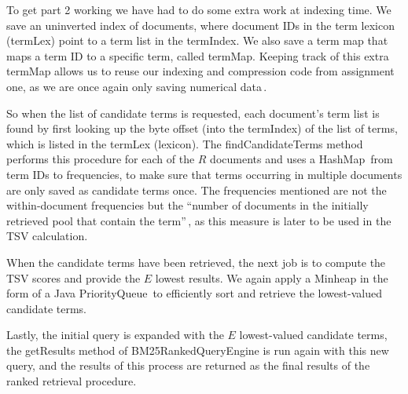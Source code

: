To get part 2 working we have had to do some extra work at indexing time. We save an uninverted index of documents, where document IDs in the term lexicon (termLex) point to a term list in the termIndex. We also save a term map that maps a term ID to a specific term, called termMap. Keeping track of this extra termMap allows us to reuse our indexing and compression code from assignment one, as we are once again only saving numerical data\,\cite{dahlsmith13}. 

So when the list of candidate terms is requested, each document's term list is found by first looking up the byte offset (into the termIndex) of the list of terms, which is listed in the termLex (lexicon). The findCandidateTerms method performs this procedure for each of the $R$ documents and uses a HashMap\,\cite{hashmap} from term IDs to frequencies, to make sure that terms occurring in multiple documents are only saved as candidate terms once. The frequencies mentioned are not the within-document frequencies but the ``number of documents in the initially retrieved pool that contain the term''\,\cite{scholer13}, as this measure is later to be used in the TSV calculation.

When the candidate terms have been retrieved, the next job is to compute the TSV scores and provide the $E$ lowest results. We again apply a Minheap in the form of a Java PriorityQueue\,\cite{priorityqueue} to efficiently sort and retrieve the lowest-valued candidate terms.

Lastly, the initial query is expanded with the $E$ lowest-valued candidate terms, the getResults method of BM25RankedQueryEngine is run again with this new query, and the results of this process are returned as the final results of the ranked retrieval procedure.